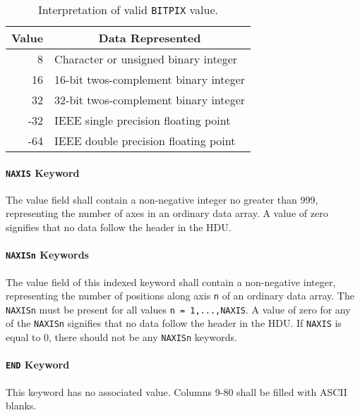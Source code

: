 \begin{table}[htpb]  
\begin{center}
 \begin{tabular}{rl} \\
     Value  & \multicolumn{1}{c}{Data Represented}     \\ \hline
          8 & Character or unsigned binary integer     \\
         16 & 16-bit twos-complement binary integer    \\ 
         32 & 32-bit twos-complement binary integer    \\ 
        -32 & IEEE single precision floating point     \\
        -64 & IEEE double precision floating point     \\
  \end{tabular}
\end{center}
\caption{Interpretation of valid {\tt BITPIX} value.}
\label{t:bitpix}
\end{table}
  
   \paragraph{{\tt NAXIS} Keyword}
 The value field shall contain a non-negative integer no greater than
 999, representing the number of axes in an ordinary data
 array. A value of zero signifies that no data follow the
 header in the HDU.

   \paragraph{{\tt NAXISn} Keywords}
   \label{s:naxisn}
 The value field of this indexed keyword
 shall contain a non-negative 
 integer, representing the number of positions along axis {\tt n} of 
 an ordinary data array.  The {\tt NAXISn} must be present 
 for all values {\tt n = 1,...,NAXIS}. A value of zero for any of 
 the {\tt NAXISn} signifies that no data follow the
 header in the HDU. If {\tt NAXIS} is equal to 0, 
 there should not be any {\tt NAXISn} keywords.
  
   \paragraph{{\tt END} Keyword}
 This keyword has no associated value.  Columns 9-80
 shall be filled with ASCII blanks.
  
